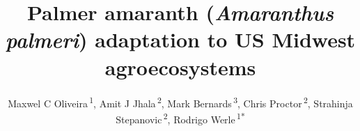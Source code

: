 \documentclass[utf8]{frontiersSCNS}
\def\Authors{
  Maxwel C Oliveira\,\textsuperscript{1},
  Amit J Jhala\,\textsuperscript{2},
  Mark Bernards\,\textsuperscript{3},
  Chris Proctor\,\textsuperscript{2},
  Strahinja Stepanovic\,\textsuperscript{2},
  Rodrigo Werle\,\textsuperscript{1*}}
\def\firstAuthorLast{Oliveira {et~al.}}
\begin{document}
\onecolumn
{}

\title[Palmer amaranth adaptation]{Palmer amaranth (\emph{Amaranthus
palmeri}) adaptation to US Midwest agroecosystems}
\author[\firstAuthorLast]{\Authors}
\address{} %
\correspondance{} %

\extraAuth{}%


\maketitle
\end{document}
